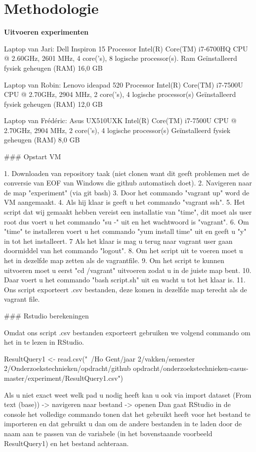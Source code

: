 \documentclass[fleqn,10pt]{artikeltin}
\begin{document}
\section{Methodologie}
\label{sec:methodologie}

\textbf{Uitvoeren experimenten}

Laptop van Jari: Dell Inspiron 15 
Processor Intel(R) Core(TM) i7-6700HQ CPU @ 2.60GHz, 2601 MHz, 4 core('s), 8 logische processor(s). 
Ram Geïnstalleerd fysiek geheugen (RAM)	16,0 GB

Laptop van Robin: Lenovo ideapad 520
Processor	Intel(R) Core(TM) i7-7500U CPU @ 2.70GHz, 2904 MHz, 2 core('s), 4 logische processor(s)
Geïnstalleerd fysiek geheugen (RAM)	12,0 GB

Laptop van Frédéric: Asus UX510UXK
Intel(R) Core(TM) i7-7500U CPU @ 2.70GHz, 2904 MHz, 2 core('s), 4 logische processor(s)
Geïnstalleerd fysiek geheugen (RAM)	8,0 GB

### Opstart VM

1. Downloaden van repository taak (niet clonen want dit geeft problemen met de conversie van EOF van Windows die github automatisch doet).
2. Navigeren naar de map "experiment" (via git bash)
3. Door het commando "vagrant up" word de VM aangemaakt.
4. Als hij klaar is geeft u het commando "vagrant ssh".
5. Het script dat wij gemaakt hebben vereist een installatie van "time", dit moet als user root dus voert u het commando "su -" uit en het wachtwoord is "vagrant".
6. Om "time" te installeren voert u het commando "yum install time" uit en geeft u "y" in tot het installeert.
7 Als het klaar is mag u terug naar vagrant user gaan doormiddel van het commando "logout". 
8. Om het script uit te voeren moet u het in dezelfde map zetten als de vagrantfile.
9. Om het script te kunnen uitvoeren moet u eerst "cd /vagrant" uitvoeren zodat u in de juiste map bent.
10. Daar voert u het commando "bash script.sh" uit en wacht u tot het klaar is.
11. Ons script exporteert .csv bestanden, deze komen in dezelfde map terecht als de vagrant file.

### Rstudio berekeningen

Omdat ons script .csv bestanden exporteert gebruiken we volgend commando om het in te lezen in RStudio.

ResultQuery1 <- read.csv("~/Ho Gent/jaar 2/vakken/semester 2/Onderzoekstechnieken/opdracht/github opdracht/onderzoekstechnieken-casus-master/experiment/ResultQuery1.csv")

Als u niet exact weet welk pad u nodig heeft kan u ook via import dataset (From text (base)) -> navigeren naar bestand -> openen
Dan gaat RStudio in de console het volledige commando tonen dat het gebruikt heeft voor het bestand te importeren en dat gebruikt u dan om de andere bestanden in te laden door de naam aan te passen van de variabele (in het bovenstaande voorbeeld ResultQuery1) en het bestand achteraan.
\end{document}
